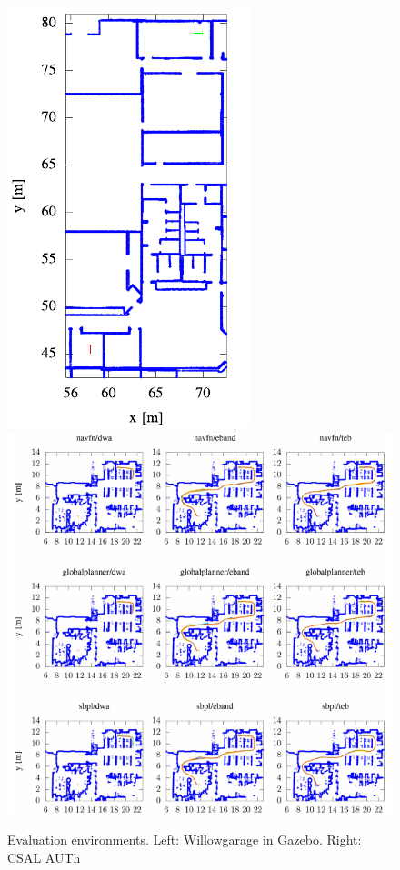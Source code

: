 \begin{frame}{}

\begin{figure}[H]\centering
  \includegraphics[scale=0.3]{figures/05/willowgarage.png}
  \includegraphics[scale=0.3]{figures/05/csal.png}
  \caption{Evaluation environments. Left: Willowgarage in Gazebo. Right: CSAL AUTh}
\end{figure}


\end{frame}
